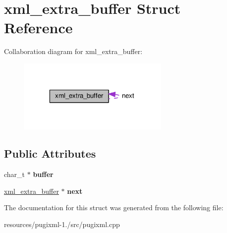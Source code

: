 \hypertarget{structxml__extra__buffer}{\section{xml\+\_\+extra\+\_\+buffer Struct Reference}
\label{structxml__extra__buffer}
}


Collaboration diagram for xml\+\_\+extra\+\_\+buffer\+:
\nopagebreak
\begin{figure}[H]
\begin{center}
\leavevmode
\includegraphics[width=208pt]{structxml__extra__buffer__coll__graph}
\end{center}
\end{figure}
\subsection*{Public Attributes}
\begin{DoxyCompactItemize}
\item 
\hypertarget{structxml__extra__buffer_ab24b191b25f92ad4d48009978ebee38c}{char\+\_\+t $\ast$ {\bfseries buffer}}\label{structxml__extra__buffer_ab24b191b25f92ad4d48009978ebee38c}

\item 
\hypertarget{structxml__extra__buffer_a8aaafa90868ca4d8e06b21eeabd96183}{\hyperlink{structxml__extra__buffer}{xml\+\_\+extra\+\_\+buffer} $\ast$ {\bfseries next}}\label{structxml__extra__buffer_a8aaafa90868ca4d8e06b21eeabd96183}

\end{DoxyCompactItemize}


The documentation for this struct was generated from the following file\+:\begin{DoxyCompactItemize}
\item 
resources/pugixml-\/1./src/pugixml.\+cpp\end{DoxyCompactItemize}
